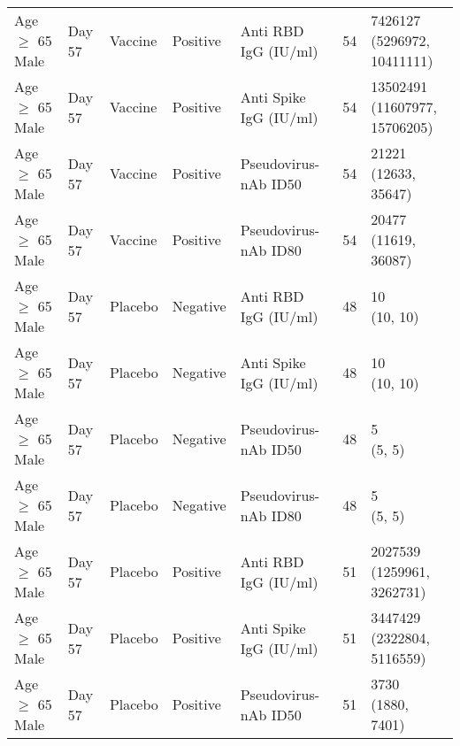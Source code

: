 \documentclass[]{book}
\theoremstyle{definition}
\theoremstyle{definition}
\theoremstyle{definition}
\newcommand{\1}{\mathbbm{1}}
\begin{document}
\begin{landscape}
\begin{ThreePartTable}
\begin{longtable}[t]{>{\raggedright\arraybackslash}p{7cm}llllll}
\hspace{1em}Age $\geq$ 65 Male & Day 57 & Vaccine & Positive & Anti RBD IgG (IU/ml) & 54 & \makecell[l]{7426127\\(5296972, 10411111)}\\
\hspace{1em}Age $\geq$ 65 Male & Day 57 & Vaccine & Positive & Anti Spike IgG (IU/ml) & 54 & \makecell[l]{13502491\\(11607977, 15706205)}\\
\hspace{1em}Age $\geq$ 65 Male & Day 57 & Vaccine & Positive & Pseudovirus-nAb ID50 & 54 & \makecell[l]{21221\\(12633, 35647)}\\
\hspace{1em}Age $\geq$ 65 Male & Day 57 & Vaccine & Positive & Pseudovirus-nAb ID80 & 54 & \makecell[l]{20477\\(11619, 36087)}\\
\hspace{1em}Age $\geq$ 65 Male & Day 57 & Placebo & Negative & Anti RBD IgG (IU/ml) & 48 & \makecell[l]{10\\(10, 10)}\\
\hspace{1em}Age $\geq$ 65 Male & Day 57 & Placebo & Negative & Anti Spike IgG (IU/ml) & 48 & \makecell[l]{10\\(10, 10)}\\
\hspace{1em}Age $\geq$ 65 Male & Day 57 & Placebo & Negative & Pseudovirus-nAb ID50 & 48 & \makecell[l]{5\\(5, 5)}\\
\hspace{1em}Age $\geq$ 65 Male & Day 57 & Placebo & Negative & Pseudovirus-nAb ID80 & 48 & \makecell[l]{5\\(5, 5)}\\
\hspace{1em}Age $\geq$ 65 Male & Day 57 & Placebo & Positive & Anti RBD IgG (IU/ml) & 51 & \makecell[l]{2027539\\(1259961, 3262731)}\\
\hspace{1em}Age $\geq$ 65 Male & Day 57 & Placebo & Positive & Anti Spike IgG (IU/ml) & 51 & \makecell[l]{3447429\\(2322804, 5116559)}\\
\hspace{1em}Age $\geq$ 65 Male & Day 57 & Placebo & Positive & Pseudovirus-nAb ID50 & 51 & \makecell[l]{3730\\(1880, 7401)}\\

\end{longtable}
\end{ThreePartTable}
\end{landscape}
\end{document}
